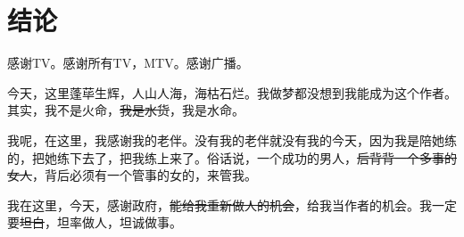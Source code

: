 \documentclass{HDU-Bachelor-Thesis}
\begin{document}
\clearpage
\section{结论}

\clearpage
{}

感谢TV。感谢所有TV，MTV。感谢广播。

今天，这里蓬荜生辉，人山人海，海枯石烂。我做梦都没想到我能成为这个作者。其实，我不是火命，\sout{我是水货}，我是水命。

我呢，在这里，我感谢我的老伴。没有我的老伴就没有我的今天，因为我是陪她练的，把她练下去了，把我练上来了。俗话说，一个成功的男人，\sout{后背背一个多事的女人}，背后必须有一个管事的女的，来管我。

我在这里，今天，感谢政府，\sout{能给我重新做人的机会}，给我当作者的机会。我一定要\sout{坦白}，坦率做人，坦诚做事。

\clearpage


\clearpage
{}
\end{document}
